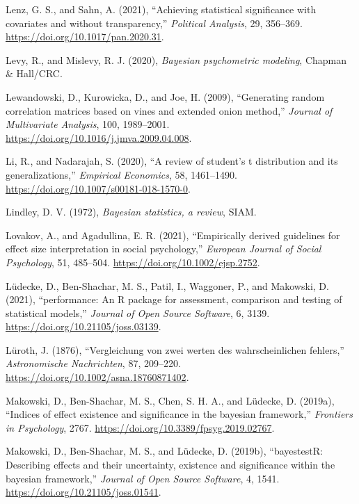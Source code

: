 \documentclass[
  10pt,
  a4paper,
  twoside]{article}
\newlength{\cslhangindent}
\newenvironment{CSLReferences}[2] %
 {\begin{list}{}{%
  \setlength{\itemindent}{0pt}
  \setlength{\leftmargin}{0pt}
  \setlength{\parsep}{0pt}
  \ifodd #1
   \setlength{\leftmargin}{\cslhangindent}
   \setlength{\itemindent}{-1\cslhangindent}
  \fi
  \setlength{\itemsep}{#2\baselineskip}}}
 {\end{list}}
\begin{document}
\begin{CSLReferences}{1}{0}
Lenz, G. S., and Sahn, A. (2021), {``Achieving statistical significance with covariates and without transparency,''} \emph{Political Analysis}, 29, 356--369. \url{https://doi.org/10.1017/pan.2020.31}.

Levy, R., and Mislevy, R. J. (2020), \emph{Bayesian psychometric modeling}, Chapman \& Hall/CRC.

Lewandowski, D., Kurowicka, D., and Joe, H. (2009), {``Generating random correlation matrices based on vines and extended onion method,''} \emph{Journal of Multivariate Analysis}, 100, 1989--2001. \url{https://doi.org/10.1016/j.jmva.2009.04.008}.

Li, R., and Nadarajah, S. (2020), {``A review of student's t distribution and its generalizations,''} \emph{Empirical Economics}, 58, 1461--1490. \url{https://doi.org/10.1007/s00181-018-1570-0}.

Lindley, D. V. (1972), \emph{Bayesian statistics, a review}, SIAM.

Lovakov, A., and Agadullina, E. R. (2021), {``Empirically derived guidelines for effect size interpretation in social psychology,''} \emph{European Journal of Social Psychology}, 51, 485--504. \url{https://doi.org/10.1002/ejsp.2752}.

Lüdecke, D., Ben-Shachar, M. S., Patil, I., Waggoner, P., and Makowski, D. (2021), {``{performance}: An {R} package for assessment, comparison and testing of statistical models,''} \emph{Journal of Open Source Software}, 6, 3139. \url{https://doi.org/10.21105/joss.03139}.

Lüroth, J. (1876), {``Vergleichung von zwei werten des wahrscheinlichen fehlers,''} \emph{Astronomische Nachrichten}, 87, 209--220. \url{https://doi.org/10.1002/asna.18760871402}.

Makowski, D., Ben-Shachar, M. S., Chen, S. H. A., and Lüdecke, D. (2019a), {``Indices of effect existence and significance in the bayesian framework,''} \emph{Frontiers in Psychology}, 2767. \url{https://doi.org/10.3389/fpsyg.2019.02767}.

Makowski, D., Ben-Shachar, M. S., and Lüdecke, D. (2019b), {``bayestestR: Describing effects and their uncertainty, existence and significance within the bayesian framework,''} \emph{Journal of Open Source Software}, 4, 1541. \url{https://doi.org/10.21105/joss.01541}.


\end{CSLReferences}
\end{document}
